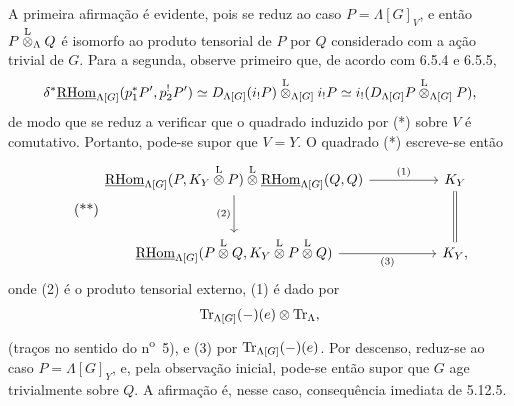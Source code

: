 A primeira afirmação é evidente, pois se reduz ao caso $P=\Lambda[G]_V$, e então $P\overset{\mathrm L}{\otimes}_{\Lambda}Q$ é isomorfo ao produto tensorial de $P$ por $Q$ considerado com a ação trivial de $G$. Para a segunda, observe primeiro que, de acordo com 6.5.4 e 6.5.5,
\[
\delta^*\underline{\mathrm{RHom}}_{\Lambda[G]}(p_1^*P',p_2^!P')
\simeq
D_{\Lambda[G]}(i_!P)\overset{\mathrm L}{\otimes}_{\Lambda[G]} i_!P
\simeq
i_!(D_{\Lambda[G]}P\overset{\mathrm L}{\otimes}_{\Lambda[G]}P),
\]
de modo que se reduz a verificar que o quadrado induzido por (*) sobre $V$ é comutativo. Portanto, pode-se supor que $V=Y$. O quadrado (*) escreve-se então
\begin{equation}
\tag{**}
\begin{tikzcd}[column sep=huge,row sep=large]
\uRHom_{\Lambda[G]}(P,K_Y\lten P)\lten\uRHom_{\Lambda[G]}(Q,Q)
  \arrow[r,"(1)"] \arrow[d,"(2)"']
& K_Y \arrow[d,equal]\\
\uRHom_{\Lambda[G]}(P\lten Q,K_Y\lten P\lten Q) \arrow[r,"(3)"']
& K_Y ,
\end{tikzcd}
\end{equation}
onde (2) é o produto tensorial externo, (1) é dado por
\[
\operatorname{Tr}_{\Lambda[G]}(-)(e)\otimes\operatorname{Tr}_{\Lambda},
\]
(traços no sentido do n\textsuperscript{o}~5), e (3) por $\operatorname{Tr}_{\Lambda[G]}(-)(e)$. Por descenso, reduz-se ao caso $P=\Lambda[G]_Y$, e, pela observação inicial, pode-se então supor que $G$ age trivialmente sobre $Q$. A afirmação é, nesse caso, consequência imediata de 5.12.5.

